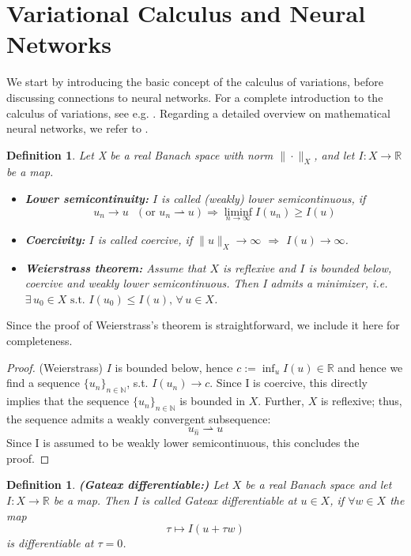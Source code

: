 \documentclass[12pt,openany]{book}
\newcommand{\R}{\mathbb{R}}
\theoremstyle{plainnormal}
\newtheorem{definition}[theorem]{Definition}
\theoremstyle{remark}
\begin{document}
\section{Variational Calculus and Neural Networks}
We start by introducing the basic concept of the calculus of variations, before discussing connections to neural networks. For a complete introduction to the calculus of variations, see e.g. \cite{Dacorogna}. Regarding a detailed overview on mathematical neural networks, we refer to \cite{e2020mathematicalunderstandingneuralnetworkbased}.
\begin{definition}%
Let X be a real Banach space with norm $\|\cdot\|_X$, and let $I: X\rightarrow\R$ be a map.
\begin{itemize}
    \item \textbf{Lower semicontinuity:} $I$ is called \emph{(weakly) lower semicontinuous}, if $$u_n \rightarrow u\text{  } (\text{or }u_n \rightharpoonup u) \Rightarrow \liminf_{n\rightarrow\infty} I(u_n)\geq I(u)$$
    \item \textbf{Coercivity:} $I$ is called \emph{coercive}, if $\|u\|_X\rightarrow \infty$ $\Rightarrow$ $ I(u) \rightarrow \infty$.
    \item \textbf{Weierstrass theorem:} Assume that $X$ is reflexive and $I$ is bounded below, coercive and weakly lower semicontinuous. Then I admits a minimizer, i.e. ~$\exists\, u_0 \in X \text{ s.t. } I(u_0) \leq I(u),\, \forall\, u \in X$.
    \label{Weierstrass}
\end{itemize}
    
\end{definition}
Since the proof of Weierstrass’s theorem is straightforward, we include it here for completeness.\begin{proof}{(Weierstrass)}
    $I$ is bounded below, hence $c:= \inf_u I(u) \in \R$ and hence we find a sequence $\{u_n\}_{n\in\mathbb{N}}$, s.t. $I(u_n)\rightarrow c$. Since I is coercive, this directly implies that the sequence $\{u_n\}_{n\in\mathbb{N}}$ is bounded in $X$. Further, $X$ is reflexive; thus, the sequence admits a weakly convergent subsequence: $$u_{\hat{n}} \rightharpoonup u$$
    Since I is assumed to be weakly lower semicontinuous, this concludes the proof. 
\end{proof}
\begin{definition}\textbf{(Gateax differentiable:)}
    Let $X$ be a real Banach space and let \mbox{$I: X\rightarrow\R$} be a map. Then I is called \emph{Gateax differentiable} at $u\in X$, if $\forall w\in X$ the map $$\tau \mapsto I(u + \tau w)$$ is differentiable at $\tau = 0$.
\end{definition}
\end{document}
